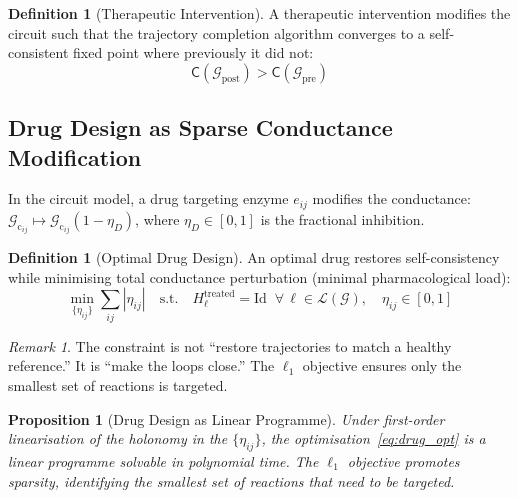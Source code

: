 \documentclass[10pt,twocolumn,a4paper]{article}
\theoremstyle{plain}
\newtheorem{proposition}[theorem]{Proposition}
\theoremstyle{definition}
\newtheorem{definition}[theorem]{Definition}
\theoremstyle{remark}
\newtheorem{remark}[theorem]{Remark}
\newcommand{\circuit}{\mathcal{G}}
\newcommand{\consist}{\mathsf{C}}
\newcommand{\Gcond}{\mathcal{G}_{\mathrm{c}}}
\begin{document}
\begin{definition}[Therapeutic Intervention]
\label{def:therapy}
A therapeutic intervention modifies the circuit such that the trajectory completion algorithm converges to a self-consistent fixed point where previously it did not:
\begin{equation}
    \consist(\circuit_{\mathrm{post}}) > \consist(\circuit_{\mathrm{pre}})
\end{equation}
\end{definition}

\subsection{Drug Design as Sparse Conductance Modification}

In the circuit model, a drug targeting enzyme $e_{ij}$ modifies the conductance: $\Gcond_{ij} \mapsto \Gcond_{ij}(1 - \eta_D)$, where $\eta_D \in [0,1]$ is the fractional inhibition.

\begin{definition}[Optimal Drug Design]
\label{def:drug_design}
An optimal drug restores self-consistency while minimising total conductance perturbation (minimal pharmacological load):
\begin{equation}
    \min_{\{\eta_{ij}\}} \sum_{ij} |\eta_{ij}| \quad \text{s.t.} \quad H_\ell^{\mathrm{treated}} = \mathrm{Id} \;\; \forall\, \ell \in \mathcal{L}(\circuit), \quad \eta_{ij} \in [0,1]
    \label{eq:drug_opt}
\end{equation}
\end{definition}

\begin{remark}
The constraint is not ``restore trajectories to match a healthy reference.'' It is ``make the loops close.'' The $\ell_1$ objective ensures only the smallest set of reactions is targeted.
\end{remark}

\begin{proposition}[Drug Design as Linear Programme]
\label{prop:drug_lp}
Under first-order linearisation of the holonomy in the $\{\eta_{ij}\}$, the optimisation~\eqref{eq:drug_opt} is a linear programme solvable in polynomial time. The $\ell_1$ objective promotes sparsity, identifying the smallest set of reactions that need to be targeted.
\end{proposition}
\end{document}

